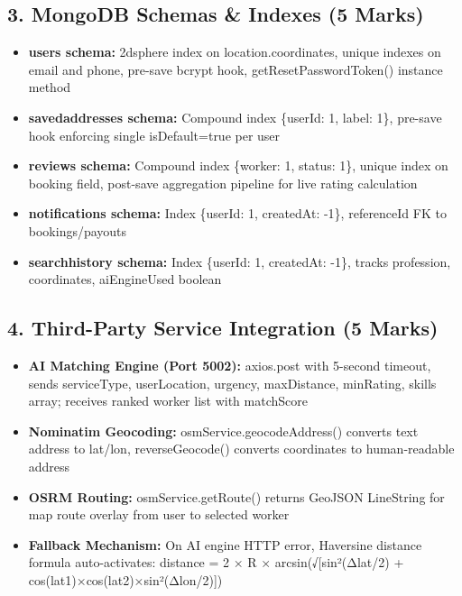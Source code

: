 \documentclass[12pt,a4paper]{article}
\begin{document}
\subsection*{3. MongoDB Schemas \& Indexes (5 Marks)}
\begin{itemize}[leftmargin=*]
    \item \textbf{users schema:} 2dsphere index on location.coordinates, unique indexes on email and phone, pre-save bcrypt hook, getResetPasswordToken() instance method
    \item \textbf{savedaddresses schema:} Compound index \{userId: 1, label: 1\}, pre-save hook enforcing single isDefault=true per user
    \item \textbf{reviews schema:} Compound index \{worker: 1, status: 1\}, unique index on booking field, post-save aggregation pipeline for live rating calculation
    \item \textbf{notifications schema:} Index \{userId: 1, createdAt: -1\}, referenceId FK to bookings/payouts
    \item \textbf{searchhistory schema:} Index \{userId: 1, createdAt: -1\}, tracks profession, coordinates, aiEngineUsed boolean
\end{itemize}

\subsection*{4. Third-Party Service Integration (5 Marks)}
\begin{itemize}[leftmargin=*]
    \item \textbf{AI Matching Engine (Port 5002):} axios.post with 5-second timeout, sends serviceType, userLocation, urgency, maxDistance, minRating, skills array; receives ranked worker list with matchScore
    \item \textbf{Nominatim Geocoding:} osmService.geocodeAddress() converts text address to lat/lon, reverseGeocode() converts coordinates to human-readable address
    \item \textbf{OSRM Routing:} osmService.getRoute() returns GeoJSON LineString for map route overlay from user to selected worker
    \item \textbf{Fallback Mechanism:} On AI engine HTTP error, Haversine distance formula auto-activates: distance = 2 × R × arcsin(√[sin²(Δlat/2) + cos(lat1)×cos(lat2)×sin²(Δlon/2)])
\end{itemize}
\end{document}
